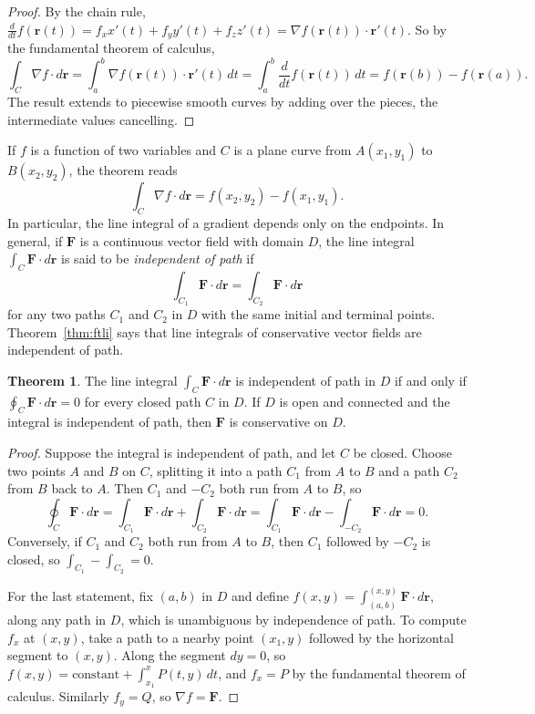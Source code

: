 \documentclass[11pt,a4paper]{article}
\theoremstyle{definition}
\newtheorem{thm}{Theorem}[subsection]
\begin{document}
\begin{proof}
By the chain rule, $\frac{d}{dt}f(\mathbf r(t)) = f_x x'(t) + f_y y'(t) + f_z
z'(t) = \nabla f(\mathbf r(t))\cdot\mathbf r'(t)$. So by the fundamental theorem
of calculus,
\[\int_C \nabla f \cdot d\mathbf r = \int_a^b \nabla f(\mathbf
r(t))\cdot\mathbf r'(t)\,dt = \int_a^b\frac{d}{dt}f(\mathbf r(t))\,dt =
f(\mathbf r(b)) - f(\mathbf r(a)) .\]
The result extends to piecewise smooth curves by adding over the pieces, the
intermediate values cancelling.
\end{proof}

If $f$ is a function of two variables and $C$ is a plane curve from
$A(x_1,y_1)$ to $B(x_2,y_2)$, the theorem reads
\[\int_C \nabla f \cdot d\mathbf r = f(x_2,y_2) - f(x_1,y_1) .\]
In particular, the line integral of a gradient depends only on the endpoints.
In general, if $\mathbf F$ is a continuous vector field with domain $D$, the
line integral $\int_C \mathbf F\cdot d\mathbf r$ is said to be
\emph{independent of path} if
\[\int_{C_1}\mathbf F\cdot d\mathbf r = \int_{C_2}\mathbf F\cdot d\mathbf r\]
for any two paths $C_1$ and $C_2$ in $D$ with the same initial and terminal
points. Theorem~\ref{thm:ftli} says that line integrals of conservative vector
fields are independent of path.

\begin{thm}
\label{thm:pathindep}
The line integral $\int_C \mathbf F\cdot d\mathbf r$ is independent of path in
$D$ if and only if $\oint_C \mathbf F\cdot d\mathbf r = 0$ for every closed path
$C$ in $D$. If $D$ is open and connected and the integral is independent of
path, then $\mathbf F$ is conservative on $D$.
\end{thm}

\begin{proof}
Suppose the integral is independent of path, and let $C$ be closed. Choose two
points $A$ and $B$ on $C$, splitting it into a path $C_1$ from $A$ to $B$ and a
path $C_2$ from $B$ back to $A$. Then $C_1$ and $-C_2$ both run from $A$ to $B$,
so
\[\oint_C\mathbf F\cdot d\mathbf r = \int_{C_1}\mathbf F\cdot d\mathbf r +
\int_{C_2}\mathbf F\cdot d\mathbf r = \int_{C_1}\mathbf F\cdot d\mathbf r -
\int_{-C_2}\mathbf F\cdot d\mathbf r = 0 .\]
Conversely, if $C_1$ and $C_2$ both run from $A$ to $B$, then $C_1$ followed by
$-C_2$ is closed, so $\int_{C_1} - \int_{C_2} = 0$.

For the last statement, fix $(a,b)$ in $D$ and define
$f(x,y) = \int_{(a,b)}^{(x,y)}\mathbf F\cdot d\mathbf r$, along any path in $D$,
which is unambiguous by independence of path. To compute $f_x$ at $(x,y)$, take
a path to a nearby point $(x_1,y)$ followed by the horizontal segment to
$(x,y)$. Along the segment $dy = 0$, so
$f(x,y) = \text{constant} + \int_{x_1}^x P(t,y)\,dt$, and $f_x = P$ by the
fundamental theorem of calculus. Similarly $f_y = Q$, so $\nabla f = \mathbf F$.
\end{proof}
\end{document}
